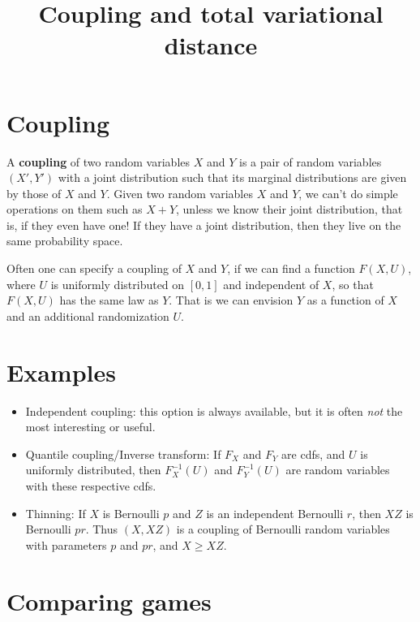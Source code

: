 \documentclass[
]{article}
\title{Coupling and total variational distance}
\author{}
\date{\vspace{-2.5em}}
\theoremstyle{definition}
\theoremstyle{definition}
\theoremstyle{definition}
\theoremstyle{remark}
\begin{document}
\maketitle

{
\setcounter{tocdepth}{2}
\tableofcontents
}
\hypertarget{coupling}{%
\section{Coupling}\label{coupling}}

A \textbf{coupling} of two random variables \(X\) and \(Y\) is a pair of random variables \((X', Y')\) with a joint distribution such that its marginal distributions are given by those of \(X\) and \(Y\). Given two random variables \(X\) and \(Y\), we can't do simple operations on them such as \(X+Y\), unless we know their joint distribution, that is, if they even have one! If they have a joint distribution, then they live on the same probability space.

Often one can specify a coupling of \(X\) and \(Y\), if we can find a function \(F(X, U)\), where \(U\) is uniformly distributed on \([0,1]\) and independent of \(X\), so that \(F(X, U)\) has the same law as \(Y\). That is we can envision \(Y\) as a function of \(X\) and an additional randomization \(U\).

\hypertarget{examples}{%
\section{Examples}\label{examples}}

\begin{itemize}
\item
  Independent coupling: this option is always available, but it is often \emph{not} the most interesting or useful.
\item
  Quantile coupling/Inverse transform: If \(F_X\) and \(F_Y\) are cdfs, and \(U\) is uniformly distributed, then \(F_X^{-1}(U)\) and \(F_Y^{-1}(U)\) are random variables with these respective cdfs.
\item
  Thinning: If \(X\) is Bernoulli \(p\) and \(Z\) is an independent Bernoulli \(r\), then \(XZ\) is Bernoulli \(pr\). Thus \((X, XZ)\) is a coupling of Bernoulli random variables with parameters \(p\) and \(pr\), and \(X \geq XZ\).
\end{itemize}

\hypertarget{comparing-games}{%
\section{Comparing games}\label{comparing-games}}
\end{document}
